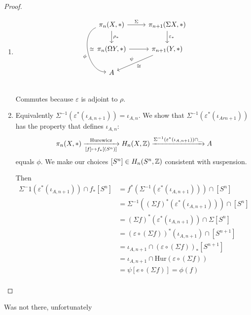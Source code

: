 \documentclass[language=english]{TemplateLecture}
\begin{document}
\begin{proof}
    \begin{enumerate}
        \item \[\begin{tikzcd}
            \pi_n(X,*) \ar[dd, bend right=80, "\cong", "\phi"'] \ar[d, "\rho_*"]\ar[r, "\Sigma"] & \pi_{n+1}(\Sigma X, *) \ar[d, "\varepsilon_*"] \\
            \pi_n(\Omega Y, *) \ar[r] & \pi_{n+1}(Y,*)\ar[dl, "\cong", "\psi"'] \\
            A & \\
        \end{tikzcd}\]
        Commutes because \(\varepsilon\) is adjoint to \(\rho\).
        \item Equivalently \(\Sigma^{-1}(\varepsilon^*(\iota_{A,n+1})) = \iota_{A,n}\). We show that \(\Sigma^{-1}(\varepsilon^*(\iota_{Ar n+1}))\)has the property that defines \(\iota_{A,n}\):
        \[\pi_n(X,*) \xrightarrow[{[f]\mapsto f_*[(S^n)]}]{\text{Hurewicz}} H_n(X,\mathbb{Z})\xrightarrow{\Sigma^{-1}(\varepsilon^*(\iota_{A,n+1}))\cap \_} A\]
        equals \(\phi\). We make our choices \([S^n]\in H_n(S^n, \mathbb{Z})\) consistent with suspension.

        Then
        \[\begin{split}
            \Sigma^-1(\varepsilon^*(\iota_{A,n+1}))\cap f_*[S^n] &= f^*(\Sigma^{-1}(\varepsilon^*(\iota_{A,n+1})))\cap [S^n] \\
            &= \Sigma^{-1}((\Sigma f)^*(\varepsilon^*(\iota_{A,n+1}))) \cap [S^n] \\
            &= (\Sigma f)^*(\varepsilon^*(\iota_{A,n+1}))\cap \Sigma[S^n] \\
            &= (\varepsilon\circ (\Sigma f))^*(\iota_{A,n+1})\cap[S^{n+1}]\\
            &= \iota_{A,n+1} \cap (\varepsilon\circ (\Sigma f))_*[S^{n+1}] \\
            &= \iota_{A, n+1} \cap \mathrm{Hur}(\varepsilon\circ (\Sigma f)) \\
            &= \psi[e\circ (\Sigma f)] = \phi(f) \\
        \end{split}\]
    \end{enumerate}
\end{proof}


Was not there, unfortunately

\end{document}
